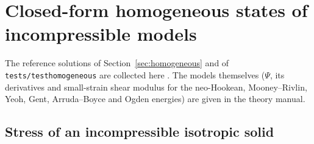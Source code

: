 \documentclass[11pt]{article}
\DeclareRobustCommand{\file}[1]{{\def\_{\textunderscore\allowbreak}\texttt{#1}}}
\begin{document}
\appendix
\section{Closed-form homogeneous states of incompressible models}
\label{app:homogeneous}

The reference solutions of Section~\ref{sec:homogeneous} and of
\file{tests/test\_homogeneous} are collected here \cite{ogden}.  The models
themselves ($\Psi$, its derivatives and small-strain shear modulus for the
neo-Hookean, Mooney--Rivlin, Yeoh, Gent, Arruda--Boyce and Ogden energies)
are given in the theory manual.

\subsection{Stress of an incompressible isotropic solid}
\end{document}
